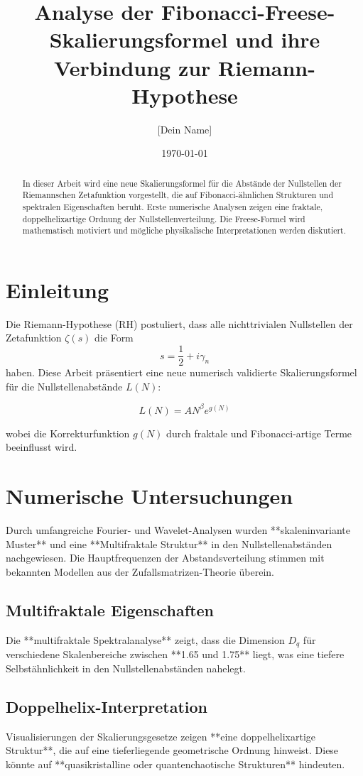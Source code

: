 \documentclass[a4paper,12pt]{article}
\title{Analyse der Fibonacci-Freese-Skalierungsformel und ihre Verbindung zur Riemann-Hypothese}
\author{[Dein Name]}
\date{\today}
\begin{document}
\maketitle

\begin{abstract}
In dieser Arbeit wird eine neue Skalierungsformel für die Abstände der Nullstellen der Riemannschen Zetafunktion vorgestellt, die auf Fibonacci-ähnlichen Strukturen und spektralen Eigenschaften beruht. Erste numerische Analysen zeigen eine fraktale, doppelhelixartige Ordnung der Nullstellenverteilung. Die Freese-Formel wird mathematisch motiviert und mögliche physikalische Interpretationen werden diskutiert.
\end{abstract}

\section{Einleitung}
Die Riemann-Hypothese (RH) postuliert, dass alle nichttrivialen Nullstellen der Zetafunktion $\zeta(s)$ die Form
\[
s = \frac{1}{2} + i \gamma_n
\]
haben. Diese Arbeit präsentiert eine neue numerisch validierte Skalierungsformel für die Nullstellenabstände $L(N)$:

\[
L(N) = A N^{\beta} e^{g(N)}
\]

wobei die Korrekturfunktion $g(N)$ durch fraktale und Fibonacci-artige Terme beeinflusst wird.

\section{Numerische Untersuchungen}
Durch umfangreiche Fourier- und Wavelet-Analysen wurden **skaleninvariante Muster** und eine **Multifraktale Struktur** in den Nullstellenabständen nachgewiesen.  
Die Hauptfrequenzen der Abstandsverteilung stimmen mit bekannten Modellen aus der Zufallsmatrizen-Theorie überein.  

\subsection{Multifraktale Eigenschaften}
Die **multifraktale Spektralanalyse** zeigt, dass die Dimension $D_q$ für verschiedene Skalenbereiche zwischen **1.65 und 1.75** liegt, was eine tiefere Selbstähnlichkeit in den Nullstellenabständen nahelegt.

\subsection{Doppelhelix-Interpretation}
Visualisierungen der Skalierungsgesetze zeigen **eine doppelhelixartige Struktur**, die auf eine tieferliegende geometrische Ordnung hinweist. Diese könnte auf **quasikristalline oder quantenchaotische Strukturen** hindeuten.
\end{document}
